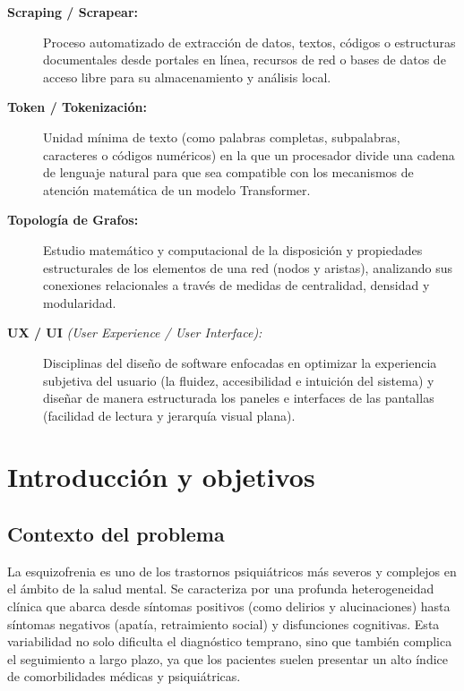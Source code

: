 \documentclass[12pt,a4paper,onecolumn,oneside]{report}
\begin{document}
\begin{description}
    \item[\textbf{Scraping / Scrapear:}] Proceso automatizado de extracción de datos, textos, códigos o estructuras documentales desde portales en línea, recursos de red o bases de datos de acceso libre para su almacenamiento y análisis local.
    
    \item[\textbf{Token / Tokenización:}] Unidad mínima de texto (como palabras completas, subpalabras, caracteres o códigos numéricos) en la que un procesador divide una cadena de lenguaje natural para que sea compatible con los mecanismos de atención matemática de un modelo Transformer.
    
    \item[\textbf{Topología de Grafos:}] Estudio matemático y computacional de la disposición y propiedades estructurales de los elementos de una red (nodos y aristas), analizando sus conexiones relacionales a través de medidas de centralidad, densidad y modularidad.
    
    \item[\textbf{UX / UI} \textit{(User Experience / User Interface):}] Disciplinas del diseño de software enfocadas en optimizar la experiencia subjetiva del usuario (la fluidez, accesibilidad e intuición del sistema) y diseñar de manera estructurada los paneles e interfaces de las pantallas (facilidad de lectura y jerarquía visual plana).
\end{description}

\setcounter{page}{1}

\chapter{Introducción y objetivos}
\section{Contexto del problema}

La esquizofrenia es uno de los trastornos psiquiátricos más severos y complejos en el ámbito de la salud mental. Se caracteriza por una profunda heterogeneidad clínica que abarca desde síntomas positivos (como delirios y alucinaciones) hasta síntomas negativos (apatía, retraimiento social) y disfunciones cognitivas. Esta variabilidad no solo dificulta el diagnóstico temprano, sino que también complica el seguimiento a largo plazo, ya que los pacientes suelen presentar un alto índice de comorbilidades médicas y psiquiátricas.
\end{document}
